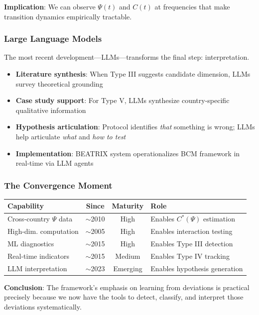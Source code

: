 \textbf{Implication}: We can observe $\Psi(t)$ and $C(t)$ at frequencies 
that make transition dynamics empirically tractable.

\subsubsection{Large Language Models}

The most recent development---LLMs---transforms the final step: interpretation.
\begin{itemize}
    \item \textbf{Literature synthesis}: When Type III suggests candidate dimension, 
          LLMs survey theoretical grounding
    \item \textbf{Case study support}: For Type V, LLMs synthesize country-specific 
          qualitative information
    \item \textbf{Hypothesis articulation}: Protocol identifies \textit{that} something 
          is wrong; LLMs help articulate \textit{what} and \textit{how to test}
    \item \textbf{Implementation}: BEATRIX system operationalizes BCM framework 
          in real-time via LLM agents
\end{itemize}

\subsubsection{The Convergence Moment}

\begin{center}
\renewcommand{\arraystretch}{1.3}
\begin{tabular}{|l|c|c|l|}
\hline
\textbf{Capability} & \textbf{Since} & \textbf{Maturity} & \textbf{Role} \\
\hline
Cross-country $\Psi$ data & $\sim$2010 & High & Enables $C^*(\Psi)$ estimation \\
High-dim. computation & $\sim$2005 & High & Enables interaction testing \\
ML diagnostics & $\sim$2015 & High & Enables Type III detection \\
Real-time indicators & $\sim$2015 & Medium & Enables Type IV tracking \\
LLM interpretation & $\sim$2023 & Emerging & Enables hypothesis generation \\
\hline
\end{tabular}
\end{center}

\textbf{Conclusion}: The framework's emphasis on learning from deviations is 
practical precisely because we now have the tools to detect, classify, and 
interpret those deviations systematically.

